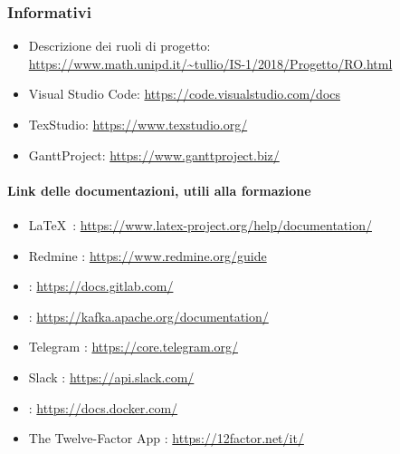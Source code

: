    \subsubsection{Informativi}	\label{rifinfo}
    \begin{itemize}
        \item Descrizione dei ruoli di progetto: \\\url{https://www.math.unipd.it/~tullio/IS-1/2018/Progetto/RO.html}
        \item Visual Studio Code: \url{https://code.visualstudio.com/docs}
        \item TexStudio: \url{https://www.texstudio.org/}
        \item GanttProject: \url{https://www.ganttproject.biz/}
	\end{itemize}

	\paragraph*{Link delle documentazioni, utili alla formazione}
	\begin{itemize}
		\item \LaTeX\ : \url{https://www.latex-project.org/help/documentation/}
		\item Redmine : \url{https://www.redmine.org/guide}
		\item {} : \url{https://docs.gitlab.com/}
		\item {} : \url{https://kafka.apache.org/documentation/}
		\item Telegram : \url{https://core.telegram.org/}
		\item Slack : \url{https://api.slack.com/}
		\item {} : \url{https://docs.docker.com/}
		\item The Twelve-Factor App : \url{https://12factor.net/it/}
	\end{itemize}
